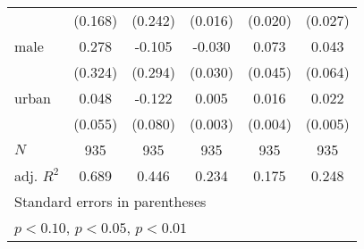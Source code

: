 {\begin{tabular}{l*{5}{c}}
            &     (0.168)         &     (0.242)         &     (0.016)         &     (0.020)         &     (0.027)         \\
[1em]
male        &       0.278         &      -0.105         &      -0.030         &       0.073         &       0.043         \\
            &     (0.324)         &     (0.294)         &     (0.030)         &     (0.045)         &     (0.064)         \\
[1em]
urban       &       0.048         &      -0.122         &       0.005\sym{**} &       0.016\sym{***}&       0.022\sym{***}\\
            &     (0.055)         &     (0.080)         &     (0.003)         &     (0.004)         &     (0.005)         \\
\hline
\(N\)       &         935         &         935         &         935         &         935         &         935         \\
adj. \(R^{2}\)&       0.689         &       0.446         &       0.234         &       0.175         &       0.248         \\
\hline\hline
\multicolumn{6}{l}{\footnotesize Standard errors in parentheses}\\
\multicolumn{6}{l}{\footnotesize \sym{*} \(p<0.10\), \sym{**} \(p<0.05\), \sym{***} \(p<0.01\)}\\
\end{tabular}
}
